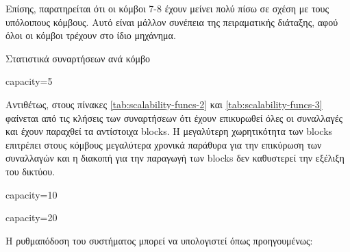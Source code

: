 \documentclass{article}
\newcommand{\eng}[1]{\foreignlanguage{english}{#1}} %
\begin{document}
Επίσης, παρατηρείται ότι οι κόμβοι 7-8 έχουν μείνει πολύ πίσω σε σχέση
με τους υπόλοιπους κόμβους. Αυτό είναι μάλλον συνέπεια της πειραματικής
διάταξης, αφού όλοι οι κόμβοι τρέχουν στο ίδιο μηχάνημα.

\begin{table}[ht]
    \caption{Στατιστικά συναρτήσεων ανά κόμβο}
    \label{tab:scalability-funcs}
    \begin{subtable}{\textwidth}
        \centering
        \caption{\eng{capacity=5}}
        \label{tab:scalability-funcs-1}
    \end{subtable}
\end{table}

Αντιθέτως, στους πίνακες \ref{tab:scalability-funcs-2} και \ref{tab:scalability-funcs-3}
φαίνεται από τις κλήσεις των συναρτήσεων ότι έχουν επικυρωθεί όλες οι συναλλαγές
και έχουν παραχθεί τα αντίστοιχα \eng{blocks}. Η μεγαλύτερη χωρητικότητα των
\eng{blocks} επιτρέπει στους κόμβους μεγαλύτερα χρονικά παράθυρα για την
επικύρωση των συναλλαγών και η διακοπή για την παραγωγή των \eng{blocks} δεν
καθυστερεί την εξέλιξη του δικτύου.

\begin{table}[ht]
    \ContinuedFloat
    \begin{subtable}{0.45\textwidth}
        \centering
        \caption{\eng{capacity=10}}
        \label{tab:scalability-funcs-2}
    \end{subtable}
    \hfill
    \begin{subtable}{0.45\textwidth}
        \centering
        \caption{\eng{capacity=20}}
        \label{tab:scalability-funcs-3}
    \end{subtable}
\end{table}

Η ρυθμαπόδοση του συστήματος μπορεί να υπολογιστεί όπως προηγουμένως:
\end{document}
